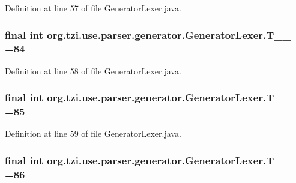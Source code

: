 Definition at line 57 of file Generator\-Lexer.\-java.

\hypertarget{classorg_1_1tzi_1_1use_1_1parser_1_1generator_1_1_generator_lexer_a652aa8ac2d9b9b4a459a8fdd136af4b4}{
\subsubsection[{T\-\_\-\-\_\-84}]{\setlength{\rightskip}{0pt plus 5cm}final int org.\-tzi.\-use.\-parser.\-generator.\-Generator\-Lexer.\-T\-\_\-\-\_ =84\hspace{0.3cm}{\ttfamily [static]}}}\label{classorg_1_1tzi_1_1use_1_1parser_1_1generator_1_1_generator_lexer_a652aa8ac2d9b9b4a459a8fdd136af4b4}


Definition at line 58 of file Generator\-Lexer.\-java.

\hypertarget{classorg_1_1tzi_1_1use_1_1parser_1_1generator_1_1_generator_lexer_a5c5753642da79a8cbc50b761f237a068}{
\subsubsection[{T\-\_\-\-\_\-85}]{\setlength{\rightskip}{0pt plus 5cm}final int org.\-tzi.\-use.\-parser.\-generator.\-Generator\-Lexer.\-T\-\_\-\-\_ =85\hspace{0.3cm}{\ttfamily [static]}}}\label{classorg_1_1tzi_1_1use_1_1parser_1_1generator_1_1_generator_lexer_a5c5753642da79a8cbc50b761f237a068}


Definition at line 59 of file Generator\-Lexer.\-java.

\hypertarget{classorg_1_1tzi_1_1use_1_1parser_1_1generator_1_1_generator_lexer_a2ebfd68eedaa8944eab9523d73881dc4}{
\subsubsection[{T\-\_\-\-\_\-86}]{\setlength{\rightskip}{0pt plus 5cm}final int org.\-tzi.\-use.\-parser.\-generator.\-Generator\-Lexer.\-T\-\_\-\-\_ =86\hspace{0.3cm}{\ttfamily [static]}}}\label{classorg_1_1tzi_1_1use_1_1parser_1_1generator_1_1_generator_lexer_a2ebfd68eedaa8944eab9523d73881dc4}


